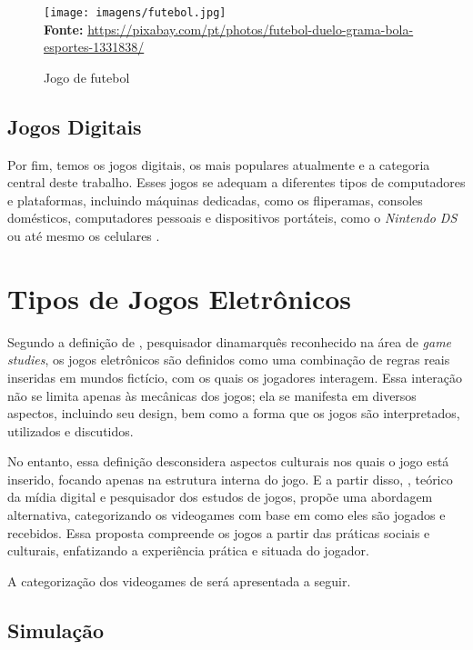 \FloatBarrier 
\begin{figure}[!htbp]
	\centering
	\caption{Jogo de futebol}
	\texttt{[image: imagens/futebol.jpg]}
	\\\textbf{Fonte:} \url{https://pixabay.com/pt/photos/futebol-duelo-grama-bola-esportes-1331838/}
	\label{fig:futebol}
\end{figure}
\FloatBarrier



\subsection{Jogos Digitais}


Por fim, temos os jogos digitais, os mais populares atualmente e a categoria central deste trabalho. Esses jogos se adequam a diferentes tipos de computadores e plataformas, incluindo máquinas dedicadas, como os fliperamas, consoles domésticos, computadores pessoais e dispositivos portáteis, como o \textit{Nintendo DS} ou até mesmo os celulares \cite{Crawford1997}.


\section{Tipos de Jogos Eletrônicos}

Segundo a definição de , pesquisador dinamarquês reconhecido na área de \textit{game studies}, os jogos eletrônicos são definidos como uma combinação de regras reais inseridas em mundos fictício, com os quais os jogadores interagem. Essa interação não se limita apenas às mecânicas dos jogos; ela se manifesta em diversos aspectos, incluindo seu design, bem como a forma que os jogos são interpretados, utilizados e discutidos.

No entanto, essa definição desconsidera aspectos culturais nos quais o jogo está inserido, focando apenas na estrutura interna do jogo. E a partir disso, , teórico da mídia digital e pesquisador dos estudos de jogos, propõe uma abordagem alternativa, categorizando os videogames com base em como eles são jogados e recebidos. Essa proposta compreende os jogos a partir das práticas sociais e culturais, enfatizando a experiência prática e situada do jogador.

A categorização dos videogames de  será apresentada a seguir.


\subsection{Simulação}

